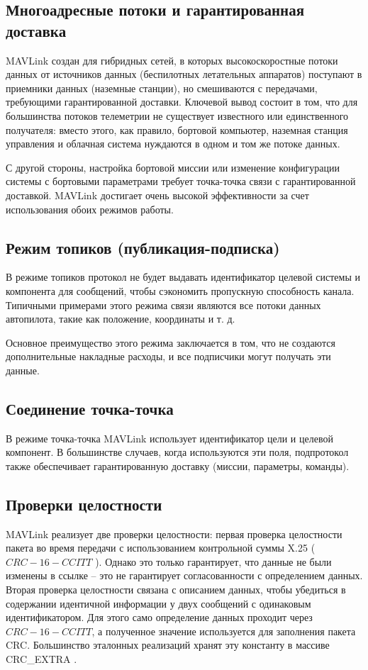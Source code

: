 \subsection{Многоадресные потоки и гарантированная доставка}
MAVLink создан для гибридных сетей, в которых высокоскоростные потоки данных от источников данных (беспилотных летательных аппаратов) поступают в приемники данных (наземные станции), но смешиваются с передачами, требующими гарантированной доставки. Ключевой вывод состоит в том, что для большинства потоков телеметрии не существует известного или единственного получателя: вместо этого, как правило, бортовой компьютер, наземная станция управления и облачная система нуждаются в одном и том же потоке данных.

С другой стороны, настройка бортовой миссии или изменение конфигурации системы с бортовыми параметрами требует точка-точка связи с гарантированной доставкой. MAVLink достигает очень высокой эффективности за счет использования обоих режимов работы.

\subsection{Режим топиков (публикация-подписка)}
В режиме топиков протокол не будет выдавать идентификатор целевой системы и компонента для сообщений, чтобы сэкономить пропускную способность канала. Типичными примерами этого режима связи являются все потоки данных автопилота, такие как положение, координаты и т. д.

Основное преимущество этого режима заключается в том, что не создаются дополнительные накладные расходы, и все подписчики могут получать эти данные.

\subsection{Соединение точка-точка}%

В режиме точка-точка MAV\-Link использует идентификатор цели и целевой компонент. В большинстве случаев, когда используются эти поля, подпротокол также обеспечивает гарантированную доставку (миссии, параметры, команды).

\subsection{Проверки целостности}
MAV\-Link реализует две проверки целостности: первая проверка целостности пакета во время передачи с использованием контрольной суммы X.25 ( $CRC-16-CCITT$ ). Однако это только гарантирует, что данные не были изменены в ссылке -- это не гарантирует согласованности с определением данных. Вторая проверка целостности связана с описанием данных, чтобы убедиться в содержании идентичной информации у двух сообщений с одинаковым идентификатором. Для этого само определение данных проходит через $CRC-16-CCITT$, а полученное значение используется для заполнения пакета CRC. Большинство эталонных реализаций хранят эту константу в массиве CRC\_EXTRA . \cite{mavlink}

